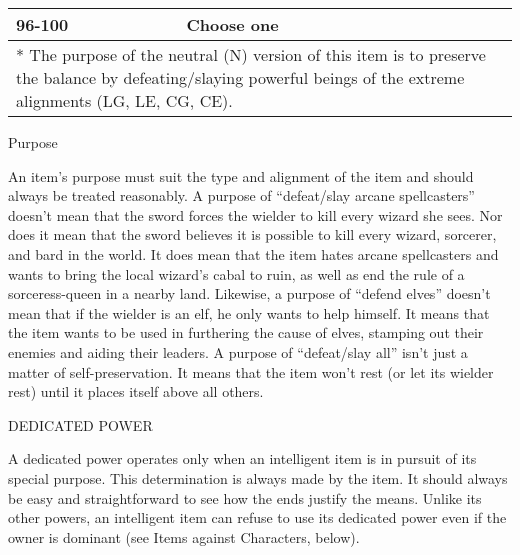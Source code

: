 \begin{longtable}{llll}
{\begin{minipage}[t]{3.335in}
96-100\end{minipage}} & \multicolumn{1}{|p{0.629in}|}{\begin{minipage}[t]{0.629in}\centering
Choose one\end{minipage}}\\
\hline
\multicolumn{3}{p{3.335in}|}{\begin{minipage}[t]{3.335in}\centering
* The purpose of the neutral (N) version of this item is to preserve the balance 
by defeating/slaying powerful beings of the extreme alignments (LG, LE, CG, CE).\end{minipage}}\\
\hline
\end{longtable}

\vspace{12pt}
Purpose

An item's purpose must suit the type and alignment of the item and should always 
be treated reasonably. A purpose of ``defeat/slay arcane spellcasters'' doesn't 
mean that the sword forces the wielder to kill every wizard she sees. Nor does 
it mean that the sword believes it is possible to kill every wizard, sorcerer, 
and bard in the world. It does mean that the item hates arcane spellcasters and 
wants to bring the local wizard's cabal to ruin, as well as end the rule of a sorceress-queen 
in a nearby land. Likewise, a purpose of ``defend elves'' doesn't mean that if 
the wielder is an elf, he only wants to help himself. It means that the item wants 
to be used in furthering the cause of elves, stamping out their enemies and aiding 
their leaders. A purpose of ``defeat/slay all'' isn't just a matter of self-preservation. 
It means that the item won't rest (or let its wielder rest) until it places itself 
above all others.

\vspace{12pt}
DEDICATED POWER

A dedicated power operates only when an intelligent item is in pursuit of its special 
purpose. This determination is always made by the item. It should always be easy 
and straightforward to see how the ends justify the means. Unlike its other powers, 
an intelligent item can refuse to use its dedicated power even if the owner is 
dominant (see Items against Characters, below).

